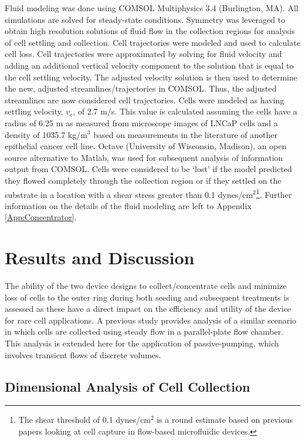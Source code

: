 Fluid modeling was done using COMSOL Multiphysics 3.4 (Burlington, MA). All simulations are solved for steady-state conditions. Symmetry was leveraged to obtain high resolution solutions of fluid flow in the collection regions for analysis of cell settling and collection. Cell trajectories were modeled and used to calculate cell loss. Cell trajectories were approximated by solving for fluid velocity and adding an additional vertical velocity component to the solution that is equal to the cell settling velocity. The adjusted velocity solution is then used to determine the new, adjusted streamlines\slash trajectories in COMSOL. Thus, the adjusted streamlines are now considered cell trajectories. Cells were modeled as having settling velocity, $v_{c}$, of 2.7 \textmu m/s. This value is calculated assuming the cells have a radius of 6.25 \textmu m as measured from microscope images of LNCaP cells and a density of 1035.7 kg/m$^{3}$ based on measurements in the literature of another epithelial cancer cell line\cite{H:1987ij}. Octave (University of Wisconsin, Madison), an open source alternative to Matlab, was used for subsequent analysis of information output from COMSOL. Cells were considered to be `lost' if the model predicted they flowed completely through the collection region or if they settled on the substrate in a location with a shear stress greater than 0.1 dynes/cm$^{2}$\footnote{The shear threshold of 0.1 dynes/cm$^{2}$ is a round estimate based on previous papers looking at cell capture in flow-based microfluidic devices\cite{GIAVAZZI:1993ty,Myung:2010fk,Nagrath:2007bs}.}. Further information on the details of the fluid modeling are left to Appendix \ref{App:Concentrator}.

\section{Results and Discussion}

The ability of the two device designs to collect\slash concentrate cells and minimize loss of cells to the outer ring during both seeding and subsequent treatments is assessed as these have a direct impact on the efficiency and utility of the device for rare cell applications. A previous study provides analysis of a similar scenario in which cells are collected using steady flow in a parallel-plate flow chamber\cite{Munn:1994fk}. This analysis is extended here for the application of passive-pumping, which involves transient flows of discrete volumes.

\subsection{Dimensional Analysis of Cell Collection}

